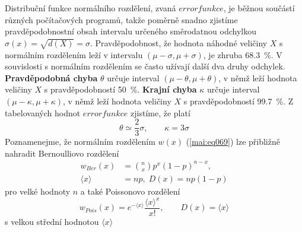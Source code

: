 \begin{mdframed}[style=mdexam]
\begin{example}
  Distribuční funkce normálního rozdělení, zvaná \(errorfunkce\), je běžnou součástí různých 
  počítačových programů, takže poměrně snadno zjistíme pravděpodobnostní obsah intervalu určeného 
  směrodatnou odchylkou \(\sigma(x) = \sqrt{d(X)} = \sigma\). Pravděpodobnost, že hodnota náhodné 
  veličiny \(X\) s normálním rozdělením leží v intervalu \((\mu - \sigma, \mu + \sigma)\), je 
  zhruba \SI{68.3}{\percent}. V souvislosti s normálním rozdělením se často užívají další 
  dva druhy odchylek. \textbf{Pravděpodobná chyba} \(\theta\) určuje interval \((\mu - \theta, \mu 
  + \theta)\), v  němž leží hodnota veličiny \(X\) s pravděpodobností \SI{50}{\percent}. 
  \textbf{Krajní chyba} \(\kappa\) určuje interval \((\mu - \kappa, \mu + \kappa)\), v němž leží 
  hodnota veličiny \(X\) s pravděpodobností \SI{99.7}{\percent}. Z tabelovaných hodnot 
  \(errorfunkce\) zjistíme, že platí
  \begin{equation}\label{mai:eq71}
   \theta \simeq \dfrac{2}{3}\sigma, \qquad \kappa = 3\sigma
  \end{equation}
  Poznamenejme, že normálním rozdělením \(w(x)\) (\ref{mai:eq069}) lze přibližně nahradit 
  Bernoulliovo rozdělení
  \begin{align*}
    w_{Ber}(x)        &= \binom{n}{x}p^x(1 - p)^{n-x},  \\
    \langle x \rangle &= np, \;  D(x) = np(1-p)
  \end{align*}
  pro velké hodnoty \(n\) a také Poissonovo rozdělení
  \begin{equation*}
    w_{Pois}(x) = e^{-\langle x \rangle}\dfrac{\langle x \rangle^x}{x!}, \qquad 
    D(x) = \langle x \rangle
  \end{equation*}
  s velkou střední hodnotou \(\langle x \rangle\)
\end{example}
\end{mdframed}